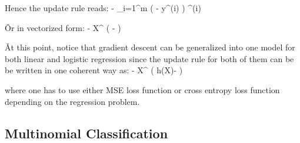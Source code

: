 Hence the update rule reads:
\bse
{} \coloneqq {} -  \sum_{i=1}^{m}
\Big(  - y^{(i)} \Big) \cdot {}^{(i)}
\ese

\v

Or in vectorized form:
\bse
{} \coloneqq {} -  X^{\intercal}
\Big( - \Big)
\ese

\v

At this point, notice that gradient descent can be generalized into one model for both linear and logistic regression
since the update rule for both of them can be be written in one coherent way as:
\bse
{} \coloneqq {} -  X^{\intercal} \Big( h(X)- \Big)
\ese

where one has to use either MSE loss function or cross entropy loss function depending on the regression problem.

\subsection{Multinomial Classification}

